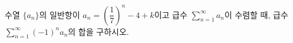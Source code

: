수열 $\{a_n\}$의 일반항이 $a_n=\left(\dfrac{1}{7}\right)^n-4+k$이고 급수 $\displaystyle\sum_{n=1}^{\infty} a_n$이 수렴할 때, 급수 $\displaystyle\sum_{n=1}^{\infty} (-1)^na_n$의 합을 구하시오. 
